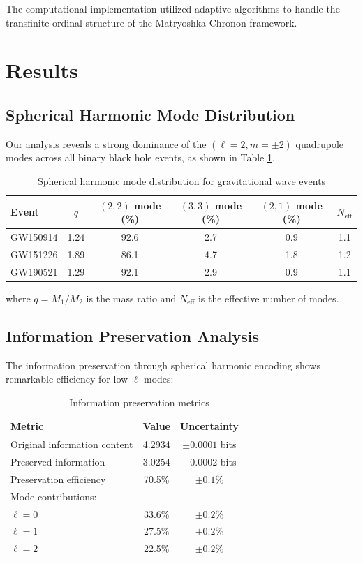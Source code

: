 \documentclass[12pt,a4paper]{article}
\begin{document}
The computational implementation utilized adaptive algorithms to handle the transfinite ordinal structure of the Matryoshka-Chronon framework.

\section{Results}

\subsection{Spherical Harmonic Mode Distribution}

Our analysis reveals a strong dominance of the $(\ell=2, m=\pm2)$ quadrupole modes across all binary black hole events, as shown in Table \ref{tab:mode_distribution}.

\begin{table}[h]
\centering
\caption{Spherical harmonic mode distribution for gravitational wave events}
\label{tab:mode_distribution}
\begin{tabular}{lccccc}
\toprule
Event & $q$ & $(2,2)$ mode (\%) & $(3,3)$ mode (\%) & $(2,1)$ mode (\%) & $N_{\text{eff}}$ \\
\midrule
GW150914 & 1.24 & 92.6 & 2.7 & 0.9 & 1.1 \\
GW151226 & 1.89 & 86.1 & 4.7 & 1.8 & 1.2 \\
GW190521 & 1.29 & 92.1 & 2.9 & 0.9 & 1.1 \\
\bottomrule
\end{tabular}
\end{table}

where $q = M_1/M_2$ is the mass ratio and $N_{\text{eff}}$ is the effective number of modes.

\subsection{Information Preservation Analysis}

The information preservation through spherical harmonic encoding shows remarkable efficiency for low-$\ell$ modes:

\begin{table}[h]
\centering
\caption{Information preservation metrics}
\label{tab:info_preservation}
\begin{tabular}{lccccc}
\toprule
Metric & Value & Uncertainty \\
\midrule
Original information content & 4.2934 & $\pm 0.0001$ bits \\
Preserved information & 3.0254 & $\pm 0.0002$ bits \\
Preservation efficiency & 70.5\% & $\pm 0.1\%$ \\
Mode contributions: & & \\
\quad $\ell = 0$ & 33.6\% & $\pm 0.2\%$ \\
\quad $\ell = 1$ & 27.5\% & $\pm 0.2\%$ \\
\quad $\ell = 2$ & 22.5\% & $\pm 0.2\%$ \\
\bottomrule
\end{tabular}
\end{table}
\end{document}

